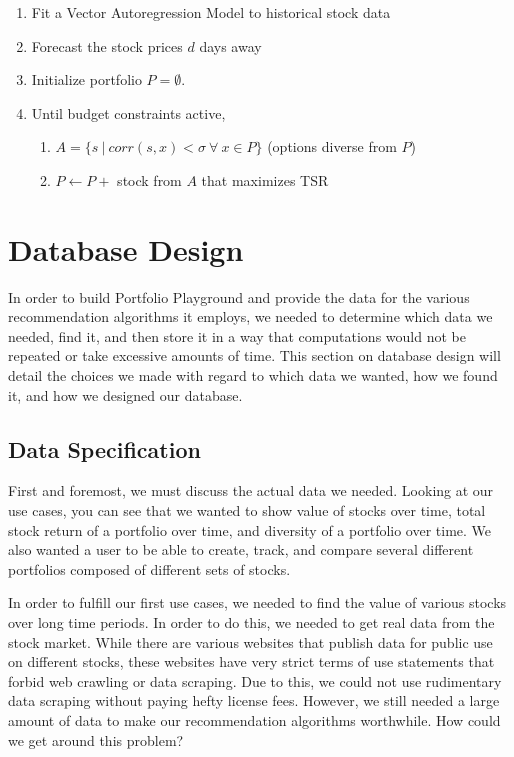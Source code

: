 \documentclass{article}
\begin{document}
\begin{enumerate}
	\item Fit a Vector Autoregression Model to historical stock data
	\item Forecast the stock prices $d$ days away
	\item Initialize portfolio $P = \emptyset$. 
	\item Until budget constraints active,
		\begin{enumerate}
			\item $A = \{s \ | \ corr(s,x) < \sigma \ \forall \ x \in P\}$ (options diverse from $P$)
			\item $P \leftarrow P +$ stock from $A$ that maximizes TSR
		\end{enumerate}
\end{enumerate}

\section{Database Design}
In order to build Portfolio Playground and provide the data for the various recommendation algorithms it employs, we needed to determine which data we needed, find it, and then store it in a way that computations would not be repeated or take excessive amounts of time.  This section on database design will detail the choices we made with regard to which data we wanted, how we found it, and how we designed our database.

\subsection{Data Specification}
First and foremost, we must discuss the actual data we needed.  Looking at our use cases, you can see that we wanted to show value of stocks over time, total stock return of a portfolio over time, and diversity of a portfolio over time.  We also wanted a user to be able to create, track, and compare several different portfolios composed of different sets of stocks.  

In order to fulfill our first use cases, we needed to find the value of various stocks over long time periods.  In order to do this, we needed to get real data from the stock market.  While there are various websites that publish data for public use on different stocks, these websites have very strict terms of use statements that forbid web crawling or data scraping.  Due to this, we could not use rudimentary data scraping without paying hefty license fees.  However, we still needed a large amount of data to make our recommendation algorithms worthwhile.  How could we get around this problem?
\end{document}
